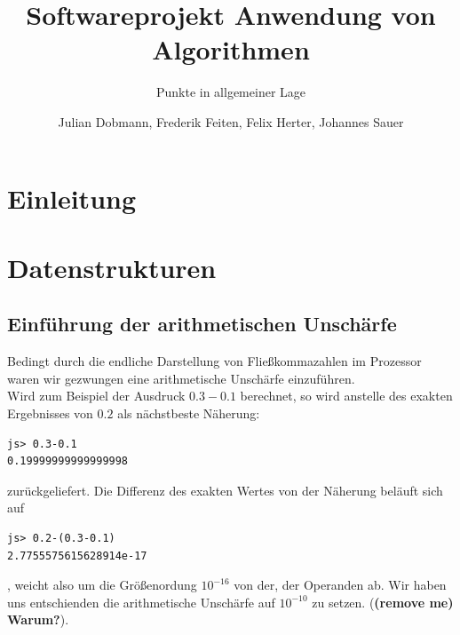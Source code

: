 \documentclass[a4paper,twocolumn]{scrartcl}
\author{Julian Dobmann, Frederik Feiten, Felix Herter, Johannes Sauer}
\title{Softwareprojekt Anwendung von Algorithmen}
\subtitle{Punkte in allgemeiner Lage}
\begin{document}

\tableofcontents

\section{Einleitung}

\section{Datenstrukturen}

\subsection{Einführung der arithmetischen Unschärfe}
Bedingt durch die endliche Darstellung von Flie\ss kommazahlen im Prozessor waren wir gezwungen eine arithmetische
Unsch\"arfe einzuf\"uhren. \\
Wird zum Beispiel der Ausdruck $0.3-0.1$ berechnet, so wird anstelle des exakten Ergebnisses von $0.2$ 
als n\"achstbeste  Näherung:
\begin{lstlisting}
js> 0.3-0.1
0.19999999999999998
\end{lstlisting}
zur\"uckgeliefert. Die Differenz des exakten Wertes von der N\"aherung bel\"auft sich auf
\begin{lstlisting}
js> 0.2-(0.3-0.1)
2.7755575615628914e-17
\end{lstlisting}
, weicht also um die Gr\"o\ss enordung $10^{-16}$ von der, der Operanden ab.
Wir haben uns entschienden die arithmetische Unsch\"arfe auf $10^{-10}$ zu setzen. (\textbf{(remove me) Warum?}).
\end{document}
